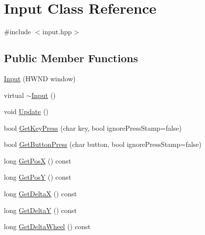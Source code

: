 \hypertarget{class_input}{}\section{Input Class Reference}
\label{class_input}


{\ttfamily \#include $<$input.\+hpp$>$}

\subsection*{Public Member Functions}
\begin{DoxyCompactItemize}
\item 
\hyperlink{class_input_ab6dcffe87310e5260061b007d9367d7b}{Input} (H\+W\+ND window)
\item 
virtual \hyperlink{class_input_a230646fa6e6433b4d9ac3535b7d52087}{$\sim$\+Input} ()
\item 
void \hyperlink{class_input_af80dcfde6dbfe39bf3bc0345c75595ce}{Update} ()
\item 
bool \hyperlink{class_input_af1b5b0b8d188e4fb42b57cf9453073d8}{Get\+Key\+Press} (char key, bool ignore\+Press\+Stamp=false)
\item 
bool \hyperlink{class_input_ad7f07b1c067eb0d7107359dce7676b96}{Get\+Button\+Press} (char button, bool ignore\+Press\+Stamp=false)
\item 
long \hyperlink{class_input_a06cd932d855b618964ddced8178ab831}{Get\+PosX} () const
\item 
long \hyperlink{class_input_ac0e08246889f7ce5d765dbb4876ceeb2}{Get\+PosY} () const
\item 
long \hyperlink{class_input_aa94c7181f990a4c7be6c82fb4a3bd382}{Get\+DeltaX} () const
\item 
long \hyperlink{class_input_a6aa19d7395fe668fdce3a5295ae3e786}{Get\+DeltaY} () const
\item 
long \hyperlink{class_input_a98f464509993520aec2dad1b6eab4845}{Get\+Delta\+Wheel} () const
\end{DoxyCompactItemize}
